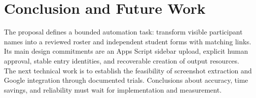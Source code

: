 \section{Conclusion and Future Work}
The proposal defines a bounded automation task: transform visible participant
names into a reviewed roster and independent student forms with matching links.
Its main design commitments are an Apps Script sidebar upload, explicit human
approval, stable entry identities, and recoverable creation of output resources.
The next technical work is to establish the feasibility of screenshot extraction
and Google integration through documented trials. Conclusions about accuracy,
time savings, and reliability must wait for implementation and measurement.
